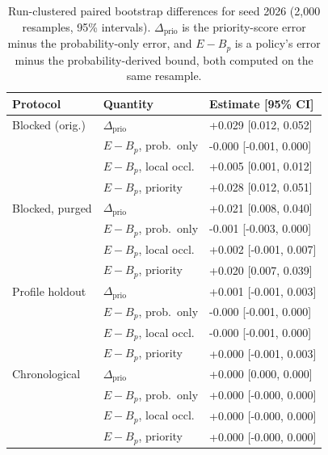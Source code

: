 \begin{table}[t]
\centering
\caption{Run-clustered paired bootstrap differences for seed 2026 (2{,}000 resamples, 95\% intervals). $\Delta_{\mathrm{prio}}$ is the priority-score error minus the probability-only error, and $E-B_p$ is a policy's error minus the probability-derived bound, both computed on the same resample.}
\label{tab:paireddiff}
\footnotesize
\setlength{\tabcolsep}{2pt}
\begin{tabular}{lll}
\toprule
Protocol & Quantity & Estimate [95\% CI] \\
\midrule
Blocked (orig.) & $\Delta_{\mathrm{prio}}$ & +0.029 [0.012, 0.052] \\
 & $E-B_p$, prob.\ only & -0.000 [-0.001, 0.000] \\
 & $E-B_p$, local occl. & +0.005 [0.001, 0.012] \\
 & $E-B_p$, priority & +0.028 [0.012, 0.051] \\
\midrule
Blocked, purged & $\Delta_{\mathrm{prio}}$ & +0.021 [0.008, 0.040] \\
 & $E-B_p$, prob.\ only & -0.001 [-0.003, 0.000] \\
 & $E-B_p$, local occl. & +0.002 [-0.001, 0.007] \\
 & $E-B_p$, priority & +0.020 [0.007, 0.039] \\
\midrule
Profile holdout & $\Delta_{\mathrm{prio}}$ & +0.001 [-0.001, 0.003] \\
 & $E-B_p$, prob.\ only & -0.000 [-0.001, 0.000] \\
 & $E-B_p$, local occl. & -0.000 [-0.001, 0.000] \\
 & $E-B_p$, priority & +0.000 [-0.001, 0.003] \\
\midrule
Chronological & $\Delta_{\mathrm{prio}}$ & +0.000 [0.000, 0.000] \\
 & $E-B_p$, prob.\ only & +0.000 [-0.000, 0.000] \\
 & $E-B_p$, local occl. & +0.000 [-0.000, 0.000] \\
 & $E-B_p$, priority & +0.000 [-0.000, 0.000] \\
\bottomrule
\end{tabular}
\end{table}

